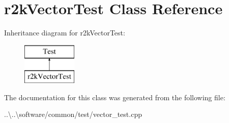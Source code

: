 \hypertarget{classr2k_vector_test}{}\section{r2k\+Vector\+Test Class Reference}
\label{classr2k_vector_test}
Inheritance diagram for r2k\+Vector\+Test\+:\begin{figure}[H]
\begin{center}
\leavevmode
\includegraphics[height=2.000000cm]{classr2k_vector_test}
\end{center}
\end{figure}


The documentation for this class was generated from the following file\+:\begin{DoxyCompactItemize}
\item 
..\textbackslash{}..\textbackslash{}software/common/test/vector\+\_\+test.\+cpp\end{DoxyCompactItemize}
